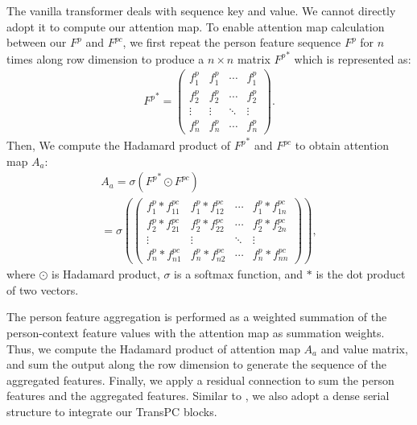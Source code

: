 \documentclass[final]{cvpr}
\begin{document}
The vanilla transformer deals with sequence key and value. We cannot directly adopt it to compute our attention map. To enable attention map calculation between our $F^p$ and $F^{pc}$, we first repeat the person feature sequence $F^p$ for $n$ times along row dimension to produce a $n\times n$ matrix ${F^{p}}^*$ which is represented as:
\begin{equation}
\begin{matrix}
{F^p}^* = 
\begin{pmatrix}
f_1^p & f_1^p & \cdots & f_1^p \\
f_2^p & f_2^p & \cdots & f_2^p \\
\vdots & \vdots & \ddots & \vdots \\
f_n^p & f_n^p & \cdots & f_n^p 
\end{pmatrix}.
\end{matrix}
\end{equation}
Then, We compute the Hadamard product of ${F^{p}}^*$ and $F^{pc}$ to obtain  attention map $A_a$:
\begin{equation}
\begin{matrix}
A_a = \sigma({F^p}^*\odot F^{pc}) \\
=\sigma(\begin{pmatrix}
f_1^p* f_{11}^{pc} & f_1^p* f_{12}^{pc} & \cdots & f_1^p* f_{1n}^{pc} \\
f_2^p* f_{21}^{pc} & f_2^p* f_{22}^{pc} & \cdots & f_2^p* f_{2n}^{pc} \\
\vdots & \vdots & \ddots & \vdots \\
f_n^p* f_{n1}^{pc} & f_n^p* f_{n2}^{pc} & \cdots & f_n^p* f_{nn}^{pc} 
\end{pmatrix}),
\end{matrix}
\label{A_a}
\end{equation}
where $\odot$ is Hadamard product, $\sigma$ is a softmax function, and $*$ is the dot product of two vectors.

The person feature aggregation is performed as a weighted summation of the person-context feature values with the attention map as  summation weights. Thus, we compute the Hadamard product of attention map $A_a$ and value matrix, and sum the output along the row dimension to generate the sequence of the aggregated features. Finally, we apply a residual connection to sum the person features and the aggregated features. Similar to \cite{DBLP:conf/eccv/TangXMPL20}, we also adopt a dense serial structure to integrate our TransPC blocks.
\vspace{-2mm}
\end{document}
